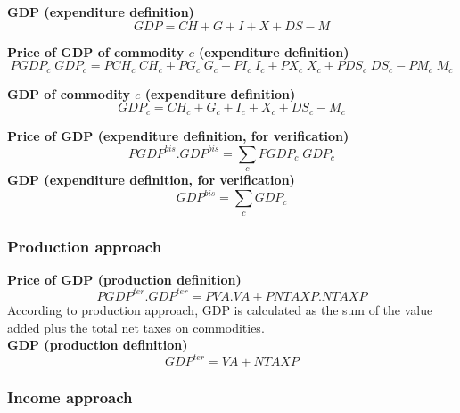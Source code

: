 \documentclass[12pt]{article}
\numberwithin{equation}{section}
\begin{document}
\noindent\textbf{GDP (expenditure definition)} \\
\begin{dmath}
GDP = CH + G + I + X + DS - M
\end{dmath}

\noindent\textbf{Price of GDP of commodity $c$ (expenditure definition)} \\
\begin{dmath}
PGDP_{c} \; GDP_{c} = PCH_{c} \; CH_{c} + PG_{c} \; G_{c} + PI_{c} \; I_{c} + PX_{c} \; X_{c} + PDS_{c} \; DS_{c} - PM_{c} \; M_{c}
\end{dmath}

\noindent\textbf{GDP of commodity $c$ (expenditure definition)} \\
\begin{dmath}
GDP_{c} = CH_{c} + G_{c} + I_{c} + X_{c} + DS_{c} - M_{c}
\end{dmath}

\noindent\textbf{Price of GDP (expenditure definition, for verification)} \\
\begin{dmath}
PGDP^{bis} . GDP^{bis} = \sum_{c} PGDP_{c} \; GDP_{c}
\end{dmath}
\noindent\textbf{GDP (expenditure definition, for verification)} \\
\begin{dmath}
GDP^{bis} = \sum_{c} GDP_{c}
\end{dmath}



\subsubsection{Production approach}


\noindent\textbf{Price of GDP (production definition)} \\
\begin{dmath}
PGDP^{ter} . GDP^{ter} = PVA . VA + PNTAXP . NTAXP
\end{dmath}
According to production approach, GDP is calculated as the sum of the value added plus the total net taxes on commodities. \\

\noindent\textbf{ GDP (production definition)} \\
\begin{dmath}
GDP^{ter} = VA + NTAXP
\end{dmath}



\subsubsection{Income approach}
\end{document}
